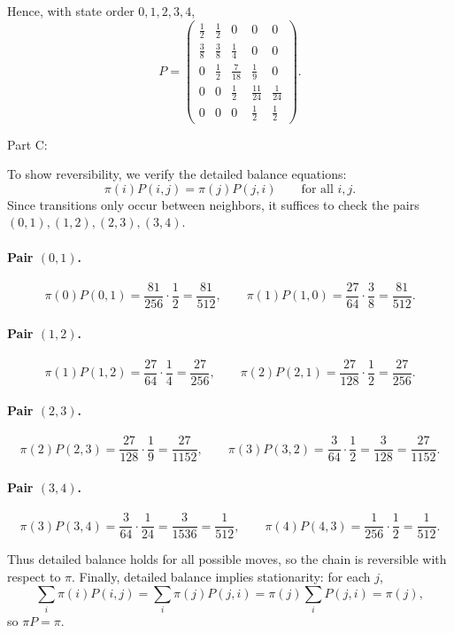 \documentclass[hidelinks]{article}
\begin{document}
\noindent Hence, with state order \(0,1,2,3,4\),
\[
P=
\begin{pmatrix}
\frac12 & \frac12 & 0 & 0 & 0 \\
\frac38 & \frac38 & \frac14 & 0 & 0 \\
0 & \frac12 & \frac{7}{18} & \frac19 & 0 \\
0 & 0 & \frac12 & \frac{11}{24} & \frac{1}{24} \\
0 & 0 & 0 & \frac12 & \frac12
\end{pmatrix}.
\]

\noindent Part C:

\noindent To show reversibility, we verify the detailed balance equations:
\[
\pi(i)P(i,j)=\pi(j)P(j,i)\qquad \text{for all } i,j.
\]
Since transitions only occur between neighbors, it suffices to check the pairs
\((0,1),(1,2),(2,3),(3,4)\).

\paragraph{Pair \((0,1)\).}
\[
\pi(0)P(0,1)=\frac{81}{256}\cdot\frac12=\frac{81}{512},\qquad
\pi(1)P(1,0)=\frac{27}{64}\cdot\frac38=\frac{81}{512}.
\]

\paragraph{Pair \((1,2)\).}
\[
\pi(1)P(1,2)=\frac{27}{64}\cdot\frac14=\frac{27}{256},\qquad
\pi(2)P(2,1)=\frac{27}{128}\cdot\frac12=\frac{27}{256}.
\]

\paragraph{Pair \((2,3)\).}
\[
\pi(2)P(2,3)=\frac{27}{128}\cdot\frac19=\frac{27}{1152},\qquad
\pi(3)P(3,2)=\frac{3}{64}\cdot\frac12=\frac{3}{128}=\frac{27}{1152}.
\]

\paragraph{Pair \((3,4)\).}
\[
\pi(3)P(3,4)=\frac{3}{64}\cdot\frac{1}{24}=\frac{3}{1536}=\frac{1}{512},\qquad
\pi(4)P(4,3)=\frac{1}{256}\cdot\frac12=\frac{1}{512}.
\]

\noindent Thus detailed balance holds for all possible moves, so the chain is reversible with respect to \(\pi\).
Finally, detailed balance implies stationarity: for each \(j\),
\[
\sum_i \pi(i)P(i,j)=\sum_i \pi(j)P(j,i)=\pi(j)\sum_i P(j,i)=\pi(j),
\]
so \(\pi P=\pi\). 
\end{document}
